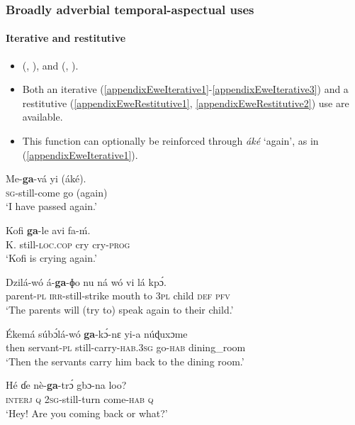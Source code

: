 \subsubsection{Broadly adverbial temporal-aspectual uses}
\paragraph{Iterative and restitutive}
\label{appendixEweIterative}
\begin{itemize}
	\item \citeauthor{Ameka1991} (\citeyear[49]{Ameka1991}, \citeyear{Ameka2008}), \textcite[468]{Rongier2015} and \citeauthor{Westermann1905} (\citeyear[152]{Westermann1905}, \citeyear[73]{Westermann1907}).
	\item Both an iterative (\ref{appendixEweIterative1}-\ref{appendixEweIterative3}) and a restitutive (\ref{appendixEweRestitutive1}, \ref{appendixEweRestitutive2}) use are available.
	\item This function can optionally be reinforced through \textit{áké} \lq again', as in (\ref{appendixEweIterative1}).
\end{itemize}
\begin{exe}
	\ex\label{appendixEweIterative1}
	\gll Me-\textbf{ga}-vá yi (áké).\\
	\textsc{sg}-still-come go (again)\\
	\glt \lq I have passed again.' \parencite[142]{Ameka2008}
	
	\ex\label{appendixEweIterative2}
	\gll Kofi \textbf{ga}-le avi fa-ḿ.\\
	K. still-\textsc{loc}.\textsc{cop} cry cry-\textsc{prog}\\
	\glt \lq Kofi is crying again.' \parencite[49]{Ameka1991}	
	
	\ex\label{appendixEweIterative3}
	\gll Dzilá-wó á-\textbf{ga}-ɸo nu ná wó vi lá kpɔ́.\\
	parent-\textsc{pl}	\textsc{irr}-still-strike mouth to 3\textsc{pl} child \textsc{def} \textsc{pfv}\\
	\glt \lq The parents will (try to) speak again to their child.'\\ \parencite[146]{Ameka1991}
	
	\ex\label{appendixEweRestitutive1}
	\gll Ékemá súbɔ́lá-wó \textbf{ga}-kɔ́-nɛ yi-a núɖuxɔme\\
	then servant-\textsc{pl} still-carry-\textsc{hab}.3\textsc{sg} go-\textsc{hab} dining\_room\\
	\glt \lq Then the servants carry him back to the dining room.\rq{ }\parencite[142]{Ameka2008}

	\ex\label{appendixEweRestitutive2}
	\gll Hé ɗe nè-\textbf{ga}-trɔ́ gbɔ-na loo?\\
	\textsc{interj} \textsc{q} 2\textsc{sg}-still-turn come-\textsc{hab} \textsc{q}\\
	\glt \lq Hey! Are you coming back or what?' \parencite[483]{Ameka1991}
\end{exe}

